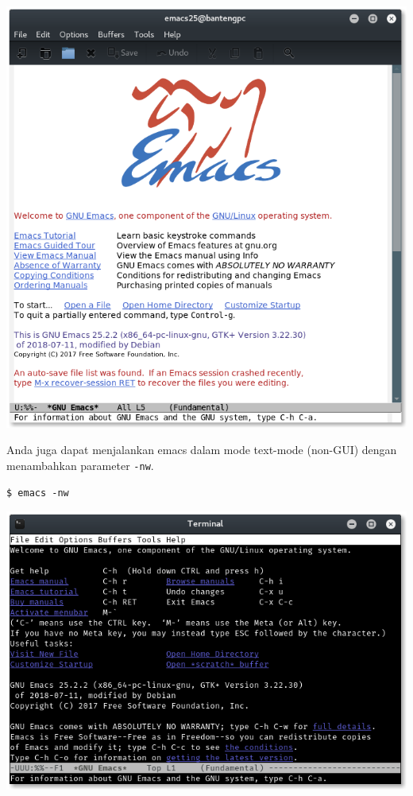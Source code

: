 \documentclass{article}
\begin{document}
\includegraphics[scale=0.45]{images/emacs1.png} 

\vspace{12pt}


Anda juga dapat menjalankan emacs dalam mode text-mode (non-GUI) 
dengan menambahkan parameter \verb=-nw=.

\begin{verbatim}
$ emacs -nw
\end{verbatim}

\vspace{12pt}

\includegraphics[scale=0.5]{images/emacs-nox.png} 
\end{document}

